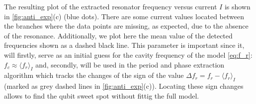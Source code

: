 \documentclass[%
 aip,
 draft,
 amsmath,amssymb,
 reprint,%
]{revtex4-1}
\begin{document}
The resulting plot of the extracted resonator frequency versus current $I$ is shown in \autoref{fig:anti_exp}(c) (blue dots). There are some current values located between the branches where the data points are missing, as expected, due to the absence of the resonance. Additionally, we plot here the mean value of the detected frequencies shown as a dashed black line. This parameter is important since it, will firstly, serve as an initial guess for the cavity frequency of the model \eqref{eq:f_r}: $f_c \approx \langle f_r \rangle_{I}$ and, secondly, will be used in the period and phase extraction algorithm which tracks the changes of the sign of the value $\Delta f_r = f_r - \langle f_r \rangle_{I}$ (marked as grey dashed lines in \autoref{fig:anti_exp}(c)). Locating these sign changes allows to find the qubit sweet spot without fittig the full model.
\end{document}
